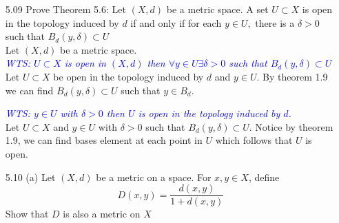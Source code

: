 \documentclass[12pt]{article}
\newcommand{\wts}[1]{\textit{\textcolor{blue}{WTS: #1}}\\}
\newcommand{\1}{^{-1}}
\begin{document}
\begin{enumerate}
		(ii) \wts{$\forall x,y \in X,  d(x,y) = d(y,x) $}
		Let $ x,y\in X $. Consider the following two cases:\\
		\\
		Case 1: $ d(x,y) = 1 = d(y,x) $\\
		Case 2: $ d(x,y) = 0  = d(y,x) $\\
		\\
		Thus, in both cases $ d(x,y)= d(y,x)$\\
		\\
		(iii) \wts{$ \forall x,y,z \in X, d(x,y)+d(y,z) \geq d(x,z)$}
		Let $ x,y,z \in X $. Consider the following:\\
		\\
		Case 1: $ x \neq y \neq z \implies  d(x,y)+d(y,z)= 2 \geq d(x,z) = 1 \implies 2 \geq 1$\\
		Case 2: $ y = x \text{ or } y = z  \implies d(x,y)+d(y,z) = 1 \geq d(x,z) = 1 \implies 1 \geq 1$\\
		Case 3: $ x = z \implies d(x,y)+d(y,z) = 2 \text{ or } 1\geq d(x,z) \implies  2\text{ or } 1\geq 0$\\
		Case 4: $ x = y = z \implies d(x,y)+d(y,z) = 0 \geq d(x,z) = 0 \implies 0 \geq 0$\\
		\\
		Thus, all cases hold.\\
		\\
		Therefore, the three conditions of a metric are satisfied and $d$ is a metric.\\
		\\
		This is the discrete metric.
		\item[5.09] Prove Theorem 5.6: Let $(X, d)$ be a metric space. A set $U \subset X$ is open in the topology induced by $d$ if and only if for each $y \in U,$ there is a $\delta>0$ such that $B_{d}(y, \delta) \subset U$\\
		Let $ (X,d) $ be a metric space.\\
		\wts{$ U \subset X $ is open in $ (X,d) $ then $ \forall y\in U \exists \delta > 0 $ such that $B_d(y,\delta)\subset U$}
		Let $ U\subset X $ be open in the topology induced by $ d $ and $ y \in U $. By theorem 1.9 we can find $ B_d(y,\delta) \subset U $ such that $ y\in B_d$. 
		
		\wts{$ y \in U $ with $ \delta > 0 $ then $ U $ is open in the topology induced by $ d $.}
		Let $ U \subset X $ and $ y\in U $ with $ \delta > 0 $ such that $ B_d(y,\delta)\subset U $. Notice by theorem 1.9, we can find bases element at each point in $ U $ which follows that $ U $ is open. 	
		\item[5.10] (a) Let $(X, d)$ be a metric on a space. For $x, y \in X$, define
		$$
		D(x, y)=\frac{d(x, y)}{1+d(x, y)}
		$$
		Show that $D$ is also a metric on $X$\\
		

\end{enumerate}
\end{document}
